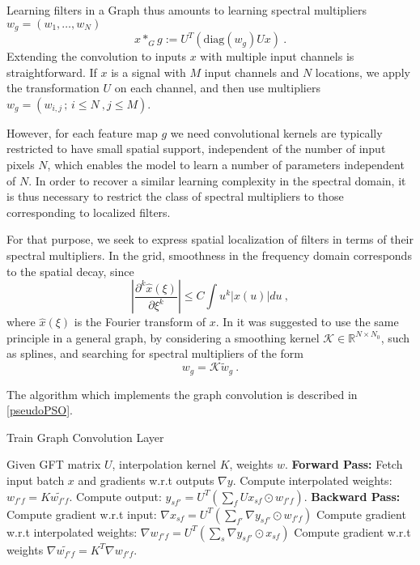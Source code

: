 \documentclass{article} %
\begin{document}
Learning filters in a Graph thus amounts to learning spectral multipliers $w_g = (w_1, \dots,w_N)$ 
$$x \ast_G g := U^T ( \mbox{diag}(w_g) U x)~.$$
Extending the convolution to inputs $x$ with multiple input channels is straightforward. If $x$ is a signal with $M$ input channels and $N$ locations, we apply the transformation $U$ on each channel, and then use multipliers $w_g =  (w_{i,j}\, ;\, i \leq N~, j \leq M)$. 

However, for each feature map $g$ we need convolutional kernels are typically restricted to have small spatial support, independent of the number of input pixels $N$, which enables the model to learn a number of parameters independent of $N$. In order to recover a similar learning complexity in the spectral domain, it is thus necessary to restrict the class of spectral multipliers to those corresponding to localized filters. 

For that purpose, we seek to express spatial localization of filters in terms of their spectral multipliers. In the grid, smoothness in the frequency domain corresponds to the spatial decay, since
$$\left| \frac{\partial^k \hat{x}(\xi)}{\partial \xi^k} \right| \leq C \int u^k |x(u)| du~,$$
where $\hat{x}(\xi)$ is the Fourier transform of $x$.
In \cite{spectralnet2013} it was suggested to use the same principle in a general graph, by considering a smoothing kernel $\mathcal{K} \in \mathbb{R}^{N \times N_0}$, such as splines, and searching for spectral multipliers of the form
$$w_g = \mathcal{K} \tilde{w}_g~.$$

The algorithm which implements the graph convolution is described in \ref{pseudoPSO}.

\begin{algorithm}
\caption{Train Graph Convolution Layer}
\label{pseudoPSO}
\begin{algorithmic}[1]
\State Given GFT matrix $U$, interpolation kernel $K$, weights $w$. 
\State \textbf{Forward Pass:}
  \State Fetch input batch $x$ and gradients w.r.t outputs $\nabla y$.
  \State Compute interpolated weights: $w_{f'f} = K \tilde{w_{f'f}}$.
  \State Compute output: $y_{sf'} = U^T\left(\sum_{f} Ux_{sf} \odot w_{f'f} \right)$.
  \State \textbf{Backward Pass:}
  \State Compute gradient w.r.t input: $\nabla x_{sf} = U^T\left(\sum_{f'} \nabla y_{sf'} \odot w_{f'f} \right)$
  \State Compute gradient w.r.t interpolated weights: $\nabla w_{f'f} = U^T\left(\sum_s \nabla y_{sf'} \odot x_{sf} \right)$
  \State Compute gradient w.r.t weights $\nabla \tilde{w_{f'f}} = K^T \nabla w_{f'f}$.
\end{algorithmic}
\end{algorithm}
\end{document}
